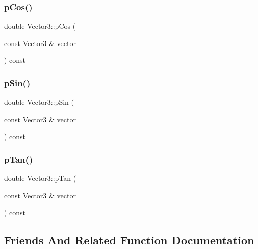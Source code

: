 \subsubsection{\texorpdfstring{pCos()}{pCos()}}
{\footnotesize\ttfamily double Vector3\+::p\+Cos (\begin{DoxyParamCaption}\item[{const \mbox{\hyperlink{class_vector3}{Vector3}} \&}]{vector }\end{DoxyParamCaption}) const\hspace{0.3cm}{\ttfamily [protected]}}

\mbox{\label{class_vector3_a38053a75ccb2f7415fff046609c52e31}} 
\subsubsection{\texorpdfstring{pSin()}{pSin()}}
{\footnotesize\ttfamily double Vector3\+::p\+Sin (\begin{DoxyParamCaption}\item[{const \mbox{\hyperlink{class_vector3}{Vector3}} \&}]{vector }\end{DoxyParamCaption}) const\hspace{0.3cm}{\ttfamily [protected]}}

\mbox{\label{class_vector3_aef71e3e404dd8183e3bd5ed901e91444}} 
\subsubsection{\texorpdfstring{pTan()}{pTan()}}
{\footnotesize\ttfamily double Vector3\+::p\+Tan (\begin{DoxyParamCaption}\item[{const \mbox{\hyperlink{class_vector3}{Vector3}} \&}]{vector }\end{DoxyParamCaption}) const\hspace{0.3cm}{\ttfamily [protected]}}



\subsection{Friends And Related Function Documentation}
\mbox{\label{class_vector3_a5500ab32f732fd9b9ed9a530b1a2ff06}} 
